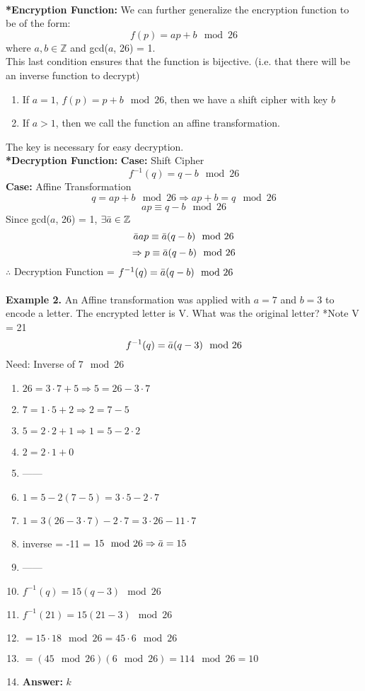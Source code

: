 \documentclass [12pt]{article}
\begin{document}
\vspace{0.2in}
\\
\textbf{*Encryption Function:}
We can further generalize the encryption function to be of the form:
\[f(p) = ap+b\mod 26\]
where $a,b\in\mathbb{Z}$ and gcd($a$, 26) = 1.\\
This last condition ensures that the function is bijective. (i.e. that there will be an inverse function to decrypt)\\
\begin{enumerate}[*]
    \item If $a=1$, $f(p)=p+b\mod26$, then we have a shift cipher with key $b$
    \item If $a>1$, then we call the function an affine transformation.
\end{enumerate}
The key is necessary for easy decryption.
\vspace{0.2in}
\\
\textbf{*Decryption Function:}
\noindent\textbf{Case:} Shift Cipher\\
\[f^{-1}(q)=q-b\mod26\]
\noindent\textbf{Case:} Affine Transformation\\
\[q=ap+b\mod26 \Rightarrow ap+b=q\mod26\]
\[ap\equiv q-b\mod26\]
Since gcd($a$, 26) = 1, $\exists \Bar{a}\in\mathbb{Z}$
\[\Bar{a}ap\equiv \Bar{a}(q-b)\mod26\]
\[\Rightarrow p \equiv \Bar{a}(q-b)\mod26\]
$\therefore$ Decryption Function = $f^{-1}(q)=\Bar{a}(q-b)\mod26$\\
\vspace{0.2in}
\\
\noindent\textbf{Example 2.} An Affine transformation was applied with $a=7$ and $b=3$ to encode a letter. The encrypted letter is V. What was the original letter? *Note V = 21
\[f^{-1}(q) = \Bar{a}(q-3)\mod26\]
Need: Inverse of $7\mod26$
\begin{enumerate}[\quad]
    \item $26=3\cdot7+5\Rightarrow5=26-3\cdot7$
    \item $7=1\cdot5+2\Rightarrow2=7-5$
    \item $5=2\cdot2+1\Rightarrow1=5-2\cdot2$
    \item $2=2\cdot1+0$
    \item ------
    \item $1=5-2(7-5)=3\cdot5-2\cdot7$
    \item $1=3(26-3\cdot7)-2\cdot7=3\cdot26-11\cdot7$
    \item inverse = -11 = $15\mod26\Rightarrow\Bar{a}=15$
    \item ------
    \item $f^{-1}(q) = 15(q-3)\mod26$
    \item $f^{-1}(21) = 15(21-3)\mod26$
    \item $=15\cdot18\mod26=45\cdot6\mod26$
    \item $=(45\mod26)(6\mod26)=114\mod26=10$
    \item\textbf{Answer:} $k$
\end{enumerate}
\end{document}
